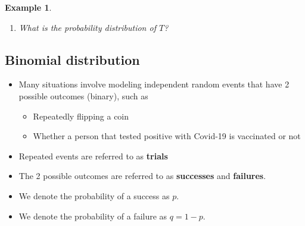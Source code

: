 \documentclass[12pt]{amsart}
\newtheorem{example}[theorem]{Example}
\begin{document}
{\begin{example}
\begin{enumerate}
\item What is the probability distribution of $T$?


\end{enumerate}


\end{example} 


\newpage




\subsection{Binomial distribution}

\begin{itemize}
\item Many situations involve modeling independent random events that have 2 possible outcomes (binary), such as
	\begin{itemize}
	\item Repeatedly flipping a coin
	\item Whether a person that tested positive with Covid-19 is vaccinated or not
	\end{itemize}
\item Repeated events are referred to as \textbf{trials}
\item The 2 possible outcomes are referred to as \textbf{successes} and \textbf{failures}.
\item We denote the probability of a success as $p$. 
\item We denote the probability of a failure as $q = 1-p$. 
\end{itemize}


}
\end{document}
